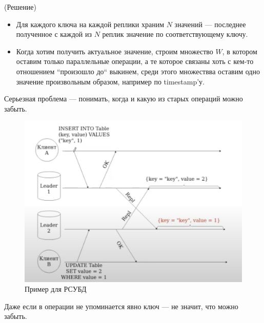         \begin{algorithm}(Решение)
          \begin{itemize}
            \item Для каждого ключа на каждой реплики храним $N$ значений --- последнее полученное с каждой из $N$ реплик значение по соответствующему ключу.
            \item Когда хотим получить актуальное значение, строим множество $W$, в котором оставим только параллельные операции, а те которое связаны хоть с кем-то отношением ``произошло до`` выкинем, среди этого множествва оставим одно значение произвольным образом, например по timestamp'у.
          \end{itemize}
        \end{algorithm}
    \begin{remark}
      Серьезная проблема --- понимать, когда и какую из старых операций можно забыть.
    \end{remark}
    \begin{example}
      \begin{figure}[h]
          \centering
          \includegraphics[scale = 0.5]{../assets/14.png}
          \caption{Пример для РСУБД}
      \end{figure}
      Даже если в операции не упоминается явно ключ --- не значит, что можно забыть.\\
    \end{example}
